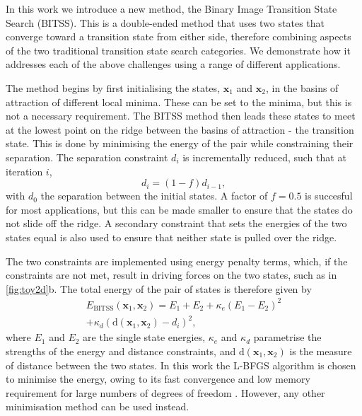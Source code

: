 \documentclass[aps,prl,twocolumn,10pt,groupedaddress]{revtex4-2}
\begin{document}
In this work we introduce a new method, the Binary Image Transition State Search (BITSS).
This is a double-ended method that uses two states that converge toward a transition state from either side, therefore combining aspects of the two traditional transition state search categories.
We demonstrate how it addresses each of the above challenges using a range of different applications.


The method begins by first initialising the states, $\bm{x}_1$ and $\bm{x}_2$, in the basins of attraction of different local minima.
These can be set to the minima, but this is not a necessary requirement.
The BITSS method then leads these states to meet at the lowest point on the ridge between the basins of attraction - the transition state.
This is done by minimising the energy of the pair while constraining their separation.
The separation constraint $d_i$ is incrementally reduced, such that at iteration $i$,
\begin{equation}\label{eq:diteration}
  d_i = (1 - f) d_{i-1},
\end{equation}
with $d_0$ the separation between the initial states.
A factor of $f = 0.5$ is succesful for most applications, but this can be made smaller to ensure that the states do not slide off the ridge.
A secondary constraint that sets the energies of the two states equal is also used to ensure that neither state is pulled over the ridge.

The two constraints are implemented using energy penalty terms, which, if the constraints are not met, result in driving forces on the two states, such as in \cref{fig:toy2d}b.
The total energy of the pair of states is therefore given by
\begin{multline}\label{eq:bitss}
  E_\text{BITSS}(\bm{x}_1, \bm{x}_2) = E_1 + E_2
    + \kappa_e \left( E_1 - E_2 \right) ^2 \\
    + \kappa_d \left( \mathrm{d}(\bm{x}_1, \bm{x}_2) - d_i \right) ^2,
\end{multline}
where $E_1$ and $E_2$ are the single state energies, $\kappa_e$ and $\kappa_d$ parametrise the strengths of the energy and distance constraints, and $\mathrm{d}(\bm{x}_1, \bm{x}_2)$ is the measure of distance between the two states.
In this work the L-BFGS algorithm is chosen to minimise the energy, owing to its fast convergence and low memory requirement for large numbers of degrees of freedom \cite{Liu1989}.
However, any other minimisation method can be used instead.
\end{document}

